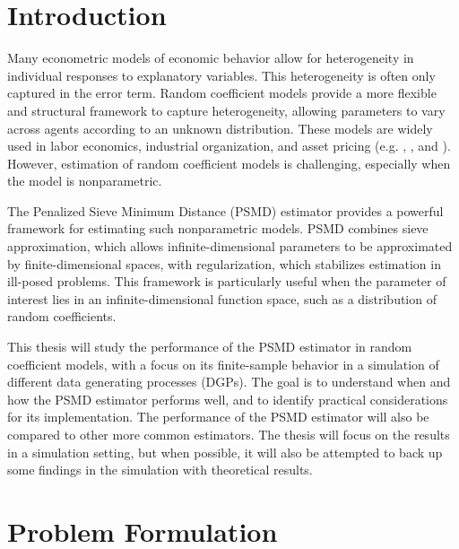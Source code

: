 
\section{Introduction}
\label{sec:introduction}

Many econometric models of economic behavior allow for heterogeneity in individual responses to explanatory variables. 
This heterogeneity is often only captured in the error term.
Random coefficient models provide a more flexible and structural framework to capture heterogeneity, allowing parameters to vary across agents according to an unknown distribution. 
These models are widely used in labor economics, industrial organization, and asset pricing (e.g. \citet{BerryLevinsohnPakes1995}, \citet{CarneiroHeckmanVytlacil2011}, \citet{BelzilHansen2007} and \citet{KoijenYogo2019}). 
However, estimation of random coefficient models is challenging, especially when the model is nonparametric.

The Penalized Sieve Minimum Distance (PSMD) estimator provides a powerful framework for estimating such nonparametric models. 
PSMD combines sieve approximation, which allows infinite-dimensional parameters to be approximated by finite-dimensional spaces, with regularization, which stabilizes estimation in ill-posed problems. 
This framework is particularly useful when the parameter of interest lies in an infinite-dimensional function space, such as a distribution of random coefficients.

This thesis will study the performance of the PSMD estimator in random coefficient models, with a focus on its finite-sample behavior in a simulation of different data generating processes (DGPs). 
The goal is to understand when and how the PSMD estimator performs well, and to identify practical considerations for its implementation.
The performance of the PSMD estimator will also be compared to other more common estimators.
The thesis will focus on the results in a simulation setting, but when possible, it will also be attempted to back up some findings in the simulation with theoretical results.

\section{Problem Formulation}
\label{sec:problem}

